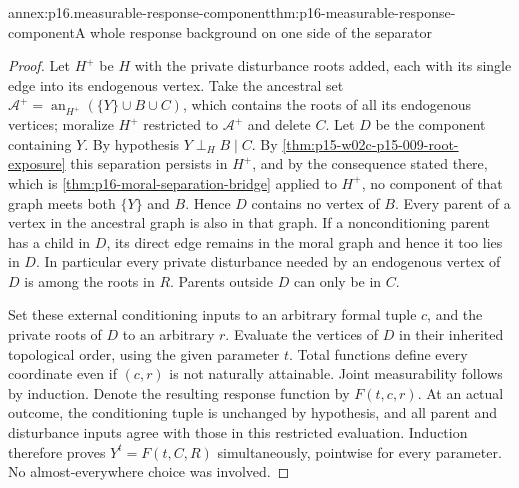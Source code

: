 \begin{annexitem}{annex:p16.measurable-response-component}{thm:p16-measurable-response-component}{A whole response background on one side of the separator}
\begin{proof}
Let \(H^+\) be \(H\) with the private disturbance roots added, each with
its single edge into its endogenous vertex. Take the ancestral set
\(\mathcal A^+=\operatorname{an}_{H^+}(\{Y\}\cup B\cup C)\), which
contains the roots of all its endogenous vertices; moralize
\(H^+\) restricted to \(\mathcal A^+\) and delete \(C\).
Let \(D\) be the component containing \(Y\). By hypothesis
\(Y\mathrel{\perp_H}B\mid C\). By
\cref{thm:p15-w02c-p15-009-root-exposure} this separation persists in
\(H^+\), and by the consequence stated there, which is
\cref{thm:p16-moral-separation-bridge} applied to \(H^+\), no component
of that graph meets both \(\{Y\}\) and \(B\). Hence \(D\) contains no
vertex of \(B\). Every parent of a vertex
in the ancestral graph is also in that graph. If a nonconditioning
parent has a child in \(D\), its direct edge remains in the moral
graph and hence it too lies in \(D\). In particular every private
disturbance needed by an endogenous vertex of \(D\) is among the
roots in \(R\). Parents outside \(D\) can only be in \(C\).

Set these external conditioning inputs to an arbitrary formal tuple
\(c\), and the private roots of \(D\) to an arbitrary \(r\).
Evaluate the vertices of \(D\) in their inherited topological order,
using the given parameter \(t\). Total functions define every
coordinate even if \((c,r)\) is not naturally attainable. Joint
measurability follows by induction. Denote the resulting response
function by \(F(t,c,r)\). At an actual outcome, the conditioning
tuple is unchanged by hypothesis, and all parent and disturbance
inputs agree with those in this restricted evaluation. Induction
therefore proves \(Y^t=F(t,C,R)\) simultaneously, pointwise for
every parameter. No almost-everywhere choice was involved.


\end{proof}
\end{annexitem}

